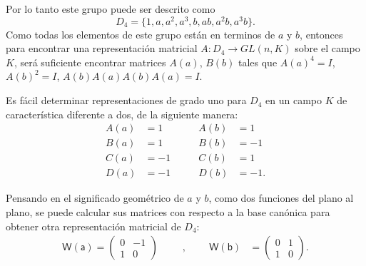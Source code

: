 \begin{ejemplo}[Representación de $D_4$]
Por lo tanto este grupo puede ser descrito  como 
\begin{equation*}
D_4 = \{ 1, a, a^2, a^3, b, ab, a^2b, a^3b \}. 
\end{equation*}
Como todas los elementos de este grupo están en terminos de $a$ y $b$, entonces para encontrar una representación matricial $A \colon D_4 \to GL(n,K)$ sobre el campo $K$, será suficiente encontrar matrices $A(a)$, $B(b)$ tales que $A(a)^4 = I$, $A(b)^2 = I$, $A(b)A(a)A(b)A(a) = I.$

Es fácil determinar representaciones de grado uno para $D_4$ en un campo $K$ de característica diferente a dos, de la siguiente manera:
\begin{equation*}
\begin{aligned}
A(a) & = 1\\
B(a) & = 1 \\ 
C(a) & = -1 \\
D(a) & = -1
\end{aligned}
\qquad 
\begin{aligned}
A(b) & = 1\\
B(b) & =  -1 \\
C(b) & = 1 \\
D(b) & = -1.
\end{aligned}
\end{equation*}

Pensando en el significado geométrico de $a$ y $b$, como dos funciones del plano al plano, se puede calcular sus matrices con respecto a la base canónica para obtener otra representación matricial de $D_4$:
\begin{equation*}
\begin{aligned}
\mathsf{W(a)} = \begin{pmatrix}
0 & -1 \\
1 & 0
\end{pmatrix}
\end{aligned}
\qquad \text{,} \qquad
\begin{aligned}
\mathsf{W(b)} &= \begin{pmatrix}
 0 & 1 \\
 1 & 0
\end{pmatrix}. 
\end{aligned}
\end{equation*}





\end{ejemplo}

